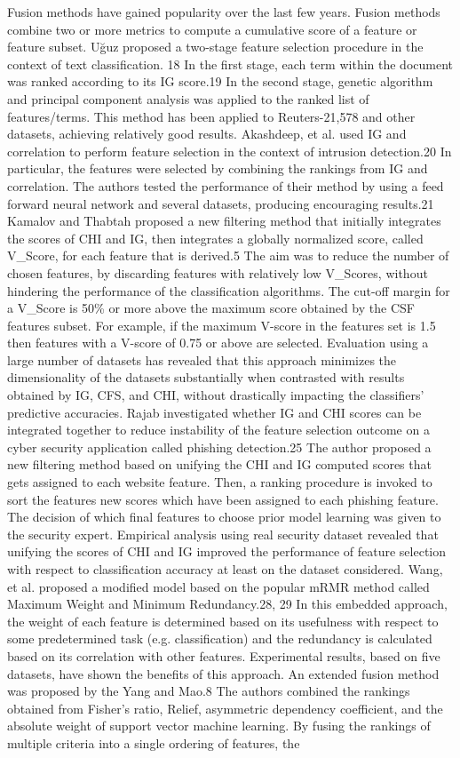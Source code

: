 \documentclass[review]{elsarticle}
\begin{document}
Fusion methods have gained popularity over the last few years. Fusion methods combine two or more metrics to compute a cumulative score of a feature or feature subset. Uğuz  proposed a two-stage feature selection procedure in the context of text classification. 18 In the first stage, each term within the document was ranked according to its IG score.19  In the second stage, genetic algorithm and principal component analysis was applied to the ranked list of features/terms.  This method has been applied to Reuters-21,578 and other datasets, achieving relatively good results.  Akashdeep, et al. used IG and correlation to perform feature selection in the context of intrusion detection.20  In particular, the features were selected by combining the rankings from IG and correlation. The authors tested the performance of their method by using a feed forward neural network  and several datasets, producing encouraging results.21  Kamalov and Thabtah proposed a new filtering method that initially integrates the scores of CHI and IG, then integrates a globally normalized score, called V\_Score, for each feature that is derived.5 The aim was to reduce the number of chosen features, by discarding features with relatively low V\_Scores, without hindering the performance of the classification algorithms. The cut-off margin for a V\_Score is 50\% or more above the maximum score obtained by the CSF features subset. For example, if the maximum V-score in the features set is 1.5 then features with a V-score of 0.75 or above are selected. Evaluation using a large number of datasets has revealed that this approach minimizes the dimensionality of the datasets substantially when contrasted with results obtained by IG, CFS, and CHI, without drastically impacting the classifiers’ predictive accuracies.  Rajab investigated whether IG and CHI scores can be integrated together to reduce instability of the feature selection outcome on a cyber security application called phishing detection.25  The author proposed a new filtering method based on unifying the CHI and IG computed  scores that gets assigned to each website feature. Then, a ranking procedure is invoked to sort the features new scores which have been assigned to each phishing feature. The decision of which final features to choose prior model learning was given to the security expert. Empirical analysis using real security dataset revealed that unifying the scores of CHI and IG improved the performance of feature selection with respect to classification accuracy at least on the dataset considered. Wang, et al. proposed a modified model based on the popular mRMR method called Maximum Weight and Minimum Redundancy.28, 29  In this embedded approach, the weight of each feature is determined based on its usefulness with respect to some predetermined task (e.g. classification) and the redundancy is calculated based on its correlation with other features. Experimental results, based on five datasets, have shown the benefits of this approach. An extended fusion method was proposed by the Yang and Mao.8 The authors combined the rankings obtained from Fisher’s ratio, Relief, asymmetric dependency coefficient, and the absolute weight of support vector machine learning. By fusing the rankings of multiple criteria into a single ordering of features, the 
\end{document}
